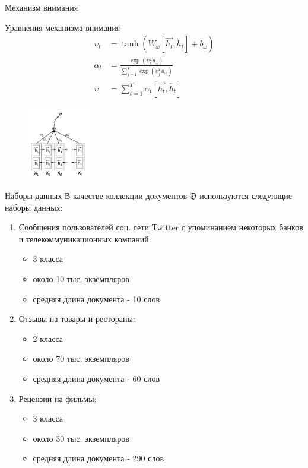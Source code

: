 \documentclass{beamer}
\begin{document}
\begin{frame}{Механизм внимания}
	\begin{block}{Уравнения механизма внимания}
	\begin{align}
	\upsilon_{t}&=\tanh{(W_{\omega}\left[\overrightarrow{h_{t}},\overleftarrow{h_{t}}\right]+b_{\omega})}\\
	\alpha_{t}&=\frac{\exp{(\upsilon_{t}^{T}u_{\omega})}}{\sum_{j=1}^{T}\exp{(\upsilon_{j}^{T}u_{\omega})}}\\
	\upsilon&=\sum_{t=1}^{T}\alpha_{t}\left[\overrightarrow{h_{t}},\overleftarrow{h_{t}}\right]
	\end{align}	
	\end{block}
\begin{figure}[!h]
  \includegraphics[width=0.25\textwidth]{images/att_edited.png}
\end{figure}
\end{frame}
\begin{frame}{Наборы данных}
	В качестве коллекции документов $\mathfrak{D}$ используются следующие наборы данных:
	\begin{enumerate}
	\item Сообщения пользователей соц. сети Twitter с упоминанием некоторых банков и телекоммуникационных компаний:
		\begin{itemize}
			\item 3 класса
			\item около 10 тыс. экземпляров
			\item средняя длина документа - 10 слов
		\end{itemize}
	\item Отзывы на товары и рестораны:
		\begin{itemize}
			\item 2 класса
			\item около 70 тыс. экземпляров
			\item средняя длина документа - 60 слов
		\end{itemize}
	\item Рецензии на фильмы:
	\begin{itemize}
			\item 3 класса
			\item около 30 тыс. экземпляров
			\item средняя длина документа - 290 слов
	\end{itemize}
	\end{enumerate}
\end{frame}
\end{document}
